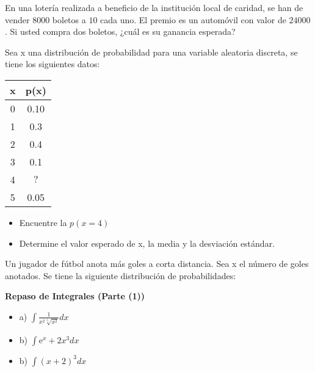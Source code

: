 \documentclass{../oxmathproblems}
\begin{document}
\begin{questions}
\miquestion En una lotería realizada a beneficio de la institución local de caridad, se han de vender 8000 boletos a $10$ cada uno. El premio es un automóvil con valor de $24 000$. Si usted compra dos boletos, ¿cuál es su ganancia esperada?

\miquestion Sea x una distribución de probabilidad para una variable aleatoria discreta, se tiene los siguientes datos: 
\begin{tabular}{| c | c |}
\hline
x & p(x) \\ \hline
0 & 0.10 \\ \hline
1 &  0.3 \\ \hline
2 & 0.4 \\ \hline
3 & 0.1 \\ \hline
4 & $?$ \\ \hline
5 & 0.05 \\ \hline
\end{tabular}
\begin{itemize}
\item Encuentre la $p(x=4)$
\item Determine el valor esperado de x, la media y la desviación estándar. 
\end{itemize}


\miquestion Un jugador de fútbol anota más goles a corta distancia. Sea  x el número de goles anotados. Se tiene la siguiente distribución de probabilidades: 





\miquestion \textbf{Repaso de Integrales (Parte (1))}
\begin{itemize}
\item a) $\int  \frac{1}{x^2 \sqrt[5]{x^2}} dx$ 
\item b) 
$\int \mathrm{e}^x+2x^3 dx $

\item b) $\int (x+2)^3 dx  $ 


\end{itemize}
\end{questions}
\end{document}

